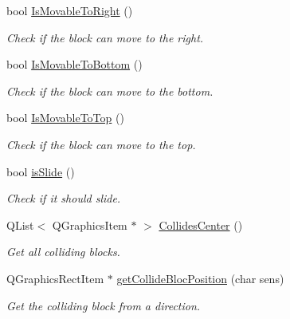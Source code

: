 \begin{DoxyCompactItemize}
bool \hyperlink{class_b___movable_a134b648413c6d27c008f8a0655ffa0f9}{Is\+Movable\+To\+Right} ()
\begin{DoxyCompactList}\small\item\em Check if the block can move to the right. \end{DoxyCompactList}\item 
bool \hyperlink{class_b___movable_a190fdc076141ae6698334bfe4dfd61a3}{Is\+Movable\+To\+Bottom} ()
\begin{DoxyCompactList}\small\item\em Check if the block can move to the bottom. \end{DoxyCompactList}\item 
bool \hyperlink{class_b___movable_a68bb6a98d031f9495cdeb80b9aa325c4}{Is\+Movable\+To\+Top} ()
\begin{DoxyCompactList}\small\item\em Check if the block can move to the top. \end{DoxyCompactList}\item 
bool \hyperlink{class_b___movable_a44d1413ec8bceda3b1a50c673b429d03}{is\+Slide} ()
\begin{DoxyCompactList}\small\item\em Check if it should slide. \end{DoxyCompactList}\item 
Q\+List$<$ Q\+Graphics\+Item $\ast$ $>$ \hyperlink{class_b___movable_a081e4e71fb9483330f3315e6b32bbcbb}{Collides\+Center} ()
\begin{DoxyCompactList}\small\item\em Get all colliding blocks. \end{DoxyCompactList}\item 
Q\+Graphics\+Rect\+Item $\ast$ \hyperlink{class_b___movable_a4cb26e3d494505eaaa6773c0a448c479}{get\+Collide\+Bloc\+Position} (char sens)
\begin{DoxyCompactList}\small\item\em Get the colliding block from a direction. \end{DoxyCompactList}\end{DoxyCompactItemize}
